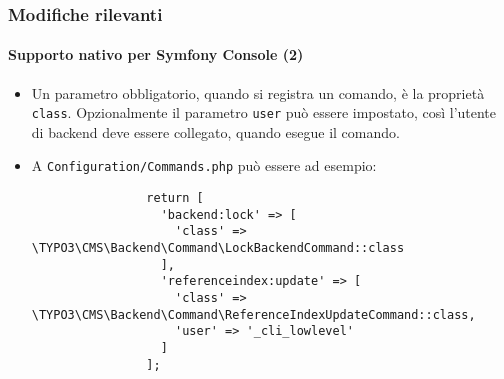 \begin{frame}[fragile]
	\frametitle{Modifiche rilevanti}
	\framesubtitle{Supporto nativo per Symfony Console (2)}

	\lstset{basicstyle=\tiny\ttfamily}

	\begin{itemize}

		\item Un parametro obbligatorio, quando si registra un comando, è la proprietà \texttt{class}.
			Opzionalmente il parametro \texttt{user} può essere impostato, così l'utente di backend
			deve essere collegato, quando esegue il comando.

		\item A \texttt{Configuration/Commands.php} può essere ad esempio:

			\begin{lstlisting}
				return [
				  'backend:lock' => [
				    'class' => \TYPO3\CMS\Backend\Command\LockBackendCommand::class
				  ],
				  'referenceindex:update' => [
				    'class' => \TYPO3\CMS\Backend\Command\ReferenceIndexUpdateCommand::class,
				    'user' => '_cli_lowlevel'
				  ]
				];
			\end{lstlisting}

	\end{itemize}

\end{frame}

